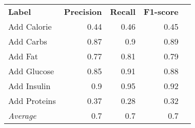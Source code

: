 \begin{tabular}{lrrrr}
    \textbf{Label} & \textbf{Precision} & \textbf{Recall} & \textbf{F1-score} \\
    Add Calorie & 0.44 & 0.46 & 0.45 \\
    Add Carbs & 0.87 & 0.9 & 0.89 \\
    Add Fat & 0.77 & 0.81 & 0.79 \\
    Add Glucose & 0.85 & 0.91 & 0.88 \\
    Add Insulin & 0.9 & 0.95 & 0.92 \\
    Add Proteins & 0.37 & 0.28 & 0.32 \\
    \emph{Average} & 0.7 & 0.7 & 0.7 \\
\end{tabular}